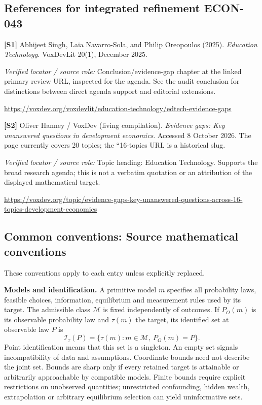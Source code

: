 \documentclass[11pt,a4paper]{article}
\begin{document}
\subsection*{References for integrated refinement ECON-043}
{\footnotesize\raggedright
\par\noindent\textbf{[S1]} Abhijeet Singh, Laia Navarro-Sola, and Philip Oreopoulos (2025). \emph{Education Technology}. VoxDevLit 20(1), December 2025.\par \textit{Verified locator / source role:} Conclusion/evidence-gap chapter at the linked primary review URL, inspected for the agenda. See the audit conclusion for distinctions between direct agenda support and editorial extensions.\par \url{https://voxdev.org/voxdevlit/education-technology/edtech-evidence-gaps}\par\smallskip
\par\noindent\textbf{[S2]} Oliver Hanney / VoxDev (living compilation). \emph{Evidence gaps: Key unanswered questions in development economics}. Accessed 8 October 2026. The page currently covers 20 topics; the ``16-topics URL is a historical slug.\par \textit{Verified locator / source role:} Topic heading: Education Technology. Supports the broad research agenda; this is not a verbatim quotation or an attribution of the displayed mathematical target.\par \url{https://voxdev.org/topic/evidence-gaps-key-unanswered-questions-across-16-topics-development-economics}\par\smallskip
}

\subsection*{Common conventions: Source mathematical conventions}

These conventions apply to each entry unless explicitly replaced.

\textbf{Models and identification.} A primitive model \(m\) specifies all probability laws, feasible choices, information, equilibrium and measurement rules used by its target. The admissible class \(\mathcal M\) is fixed independently of outcomes. If \(P_O(m)\) is its observable probability law and \(\tau(m)\) the target, its identified set at observable law \(P\) is
\[
 \mathcal I_\tau(P)=\{\tau(m):m\in\mathcal M,\ P_O(m)=P\}.
\]
Point identification means that this set is a singleton. An empty set signals incompatibility of data and assumptions. Coordinate bounds need not describe the joint set. Bounds are sharp only if every retained target is attainable or arbitrarily approachable by compatible models. Finite bounds require explicit restrictions on unobserved quantities; unrestricted confounding, hidden wealth, extrapolation or arbitrary equilibrium selection can yield uninformative sets.
\end{document}
